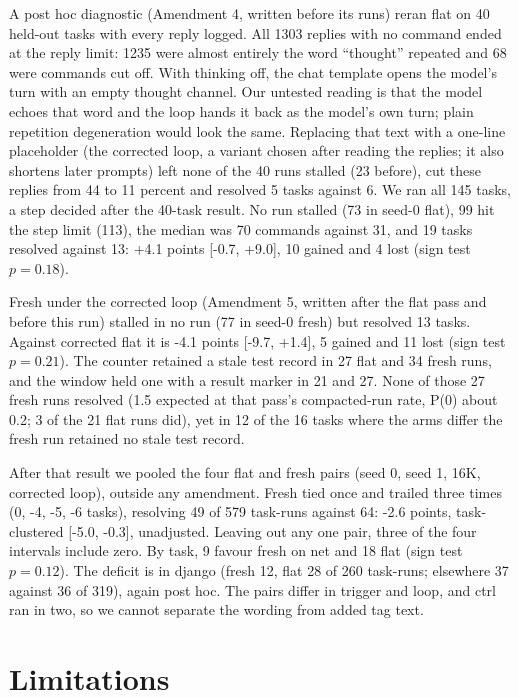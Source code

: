 \documentclass[11pt,a4paper]{article}
\begin{document}
A post hoc diagnostic (Amendment 4, written before its runs) reran flat on 40 held-out tasks with every reply logged. All 1303 replies with no command ended at the reply limit: 1235 were almost entirely the word ``thought'' repeated and 68 were commands cut off. With thinking off, the chat template opens the model's turn with an empty thought channel. Our untested reading is that the model echoes that word and the loop hands it back as the model's own turn; plain repetition degeneration would look the same. Replacing that text with a one-line placeholder (the corrected loop, a variant chosen after reading the replies; it also shortens later prompts) left none of the 40 runs stalled (23 before), cut these replies from 44 to 11 percent and resolved 5 tasks against 6. We ran all 145 tasks, a step decided after the 40-task result. No run stalled (73 in seed-0 flat), 99 hit the step limit (113), the median was 70 commands against 31, and 19 tasks resolved against 13: +4.1 points [-0.7, +9.0], 10 gained and 4 lost (sign test $p = 0.18$).

Fresh under the corrected loop (Amendment 5, written after the flat pass and before this run) stalled in no run (77 in seed-0 fresh) but resolved 13 tasks. Against corrected flat it is -4.1 points [-9.7, +1.4], 5 gained and 11 lost (sign test $p = 0.21$). The counter retained a stale test record in 27 flat and 34 fresh runs, and the window held one with a result marker in 21 and 27. None of those 27 fresh runs resolved (1.5 expected at that pass's compacted-run rate, P(0) about 0.2; 3 of the 21 flat runs did), yet in 12 of the 16 tasks where the arms differ the fresh run retained no stale test record.

After that result we pooled the four flat and fresh pairs (seed 0, seed 1, 16K, corrected loop), outside any amendment. Fresh tied once and trailed three times (0, -4, -5, -6 tasks), resolving 49 of 579 task-runs against 64: -2.6 points, task-clustered [-5.0, -0.3], unadjusted. Leaving out any one pair, three of the four intervals include zero. By task, 9 favour fresh on net and 18 flat (sign test $p = 0.12$). The deficit is in django (fresh 12, flat 28 of 260 task-runs; elsewhere 37 against 36 of 319), again post hoc. The pairs differ in trigger and loop, and ctrl ran in two, so we cannot separate the wording from added tag text.

\section{Limitations}
\end{document}
